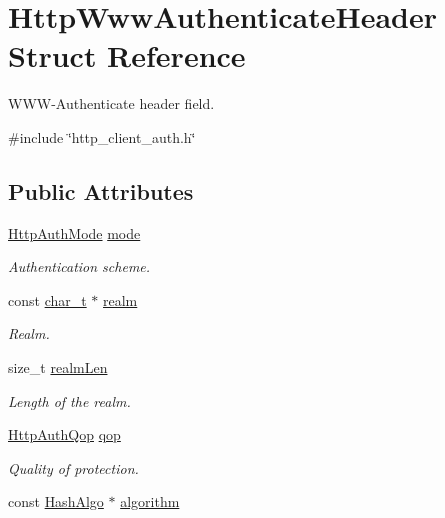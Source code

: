 \hypertarget{structHttpWwwAuthenticateHeader}{}\section{Http\+Www\+Authenticate\+Header Struct Reference}
\label{structHttpWwwAuthenticateHeader}


W\+W\+W-\/\+Authenticate header field.  




{\ttfamily \#include \char`\"{}http\+\_\+client\+\_\+auth.\+h\char`\"{}}

\subsection*{Public Attributes}
\begin{DoxyCompactItemize}
\item 
\hyperlink{http__common_8h_ad435f9e57a3351beaec6fc809eff4f31}{Http\+Auth\+Mode} \hyperlink{structHttpWwwAuthenticateHeader_a776f86c339aba82d0b145c83d366d243}{mode}
\begin{DoxyCompactList}\small\item\em Authentication scheme. \end{DoxyCompactList}\item 
const \hyperlink{compiler__port_8h_a40bb5262bf908c328fbcfbe5d29d0201}{char\+\_\+t} $\ast$ \hyperlink{structHttpWwwAuthenticateHeader_a8d516fa140d7d8f839a3877aa207c46c}{realm}
\begin{DoxyCompactList}\small\item\em Realm. \end{DoxyCompactList}\item 
size\+\_\+t \hyperlink{structHttpWwwAuthenticateHeader_a7645656f51f2ea4df183446e42442f6e}{realm\+Len}
\begin{DoxyCompactList}\small\item\em Length of the realm. \end{DoxyCompactList}\item 
\hyperlink{http__common_8h_add2473701f02b0e633970b91bebf92b0}{Http\+Auth\+Qop} \hyperlink{structHttpWwwAuthenticateHeader_a9b039c3e85d0142f4a336ba085581d83}{qop}
\begin{DoxyCompactList}\small\item\em Quality of protection. \end{DoxyCompactList}\item 
const \hyperlink{structHashAlgo}{Hash\+Algo} $\ast$ \hyperlink{structHttpWwwAuthenticateHeader_ad1152391a0ce4952518a457f5082e128}{algorithm}

\end{DoxyCompactItemize}
